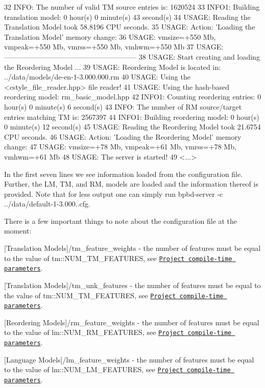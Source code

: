 \begin{DoxyCode}
32 INFO: The number of valid TM source entries is: 1620524
33 INFO1: Building translation model:  0 hour(s) 0 minute(s) 43 second(s) 
34 USAGE: Reading the Translation Model took 58.8196 CPU seconds.
35 USAGE: Action: 'Loading the Translation Model' memory change:
36 USAGE: vmsize=+550 Mb, vmpeak=+550 Mb, vmrss=+550 Mb, vmhwm=+550 Mb
37 USAGE: --------------------------------------------------------
38 USAGE: Start creating and loading the Reordering Model ...
39 USAGE: Reordering Model is located in: ../data/models/de-en-1-3.000.000.rm
40 USAGE: Using the <cstyle\_file\_reader.hpp> file reader!
41 USAGE: Using the hash-based reordering model: rm\_basic\_model.hpp
42 INFO1: Counting reordering entries:  0 hour(s) 0 minute(s) 6 second(s) 
43 INFO: The number of RM source/target entries matching TM is: 2567397
44 INFO1: Building reordering model:  0 hour(s) 0 minute(s) 12 second(s) 
45 USAGE: Reading the Reordering Model took 21.6754 CPU seconds.
46 USAGE: Action: 'Loading the Reordering Model' memory change:
47 USAGE: vmsize=+78 Mb, vmpeak=+61 Mb, vmrss=+78 Mb, vmhwm=+61 Mb
48 USAGE: The server is started!
49 <...>
\end{DoxyCode}
 In the first seven lines we see information loaded from the configuration file. Further, the L\+M, T\+M, and R\+M, models are loaded and the information thereof is provided. Note that for less output one can simply run {\ttfamily bpbd-\/server -\/c ../data/default-\/1-\/3.000..\+cfg}.

There is a few important things to note about the configuration file at the moment\+:


\begin{DoxyItemize}
\item {\ttfamily \mbox{[}Translation Models\mbox{]}/tm\+\_\+feature\+\_\+weights} -\/ the number of features must be equal to the value of {\ttfamily tm\+::\+N\+U\+M\+\_\+\+T\+M\+\_\+\+F\+E\+A\+T\+U\+R\+E\+S}, see \href{#project-compile-time-parameters}{\tt Project compile-\/time parameters}.
\item {\ttfamily \mbox{[}Translation Models\mbox{]}/tm\+\_\+unk\+\_\+features} -\/ the number of features must be equal to the value of {\ttfamily tm\+::\+N\+U\+M\+\_\+\+T\+M\+\_\+\+F\+E\+A\+T\+U\+R\+E\+S}, see \href{#project-compile-time-parameters}{\tt Project compile-\/time parameters}.
\item {\ttfamily \mbox{[}Reordering Models\mbox{]}/rm\+\_\+feature\+\_\+weights} -\/ the number of features must be equal to the value of {\ttfamily lm\+::\+N\+U\+M\+\_\+\+R\+M\+\_\+\+F\+E\+A\+T\+U\+R\+E\+S}, see \href{#project-compile-time-parameters}{\tt Project compile-\/time parameters}.
\item {\ttfamily \mbox{[}Language Models\mbox{]}/lm\+\_\+feature\+\_\+weights} -\/ the number of features must be equal to the value of {\ttfamily lm\+::\+N\+U\+M\+\_\+\+L\+M\+\_\+\+F\+E\+A\+T\+U\+R\+E\+S}, see \href{#project-compile-time-parameters}{\tt Project compile-\/time parameters}.
\end{DoxyItemize}

